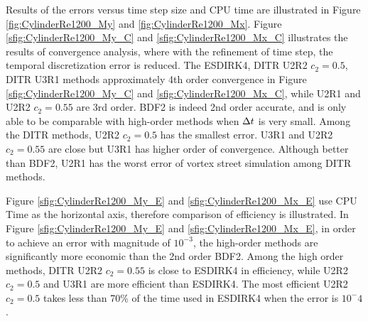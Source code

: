 \documentclass[preprint,12pt]{elsarticle}
\begin{document}
Results of the errors versus time step size and CPU time
are illustrated in
Figure \ref{fig:CylinderRe1200_My} and \ref{fig:CylinderRe1200_Mx}.
Figure \ref{sfig:CylinderRe1200_My_C} and \ref{sfig:CylinderRe1200_Mx_C}
illustrates the results of convergence analysis, where
with the refinement of time step, the temporal
discretization error is reduced.
The ESDIRK4, DITR U2R2 $c_2=0.5$, DITR U3R1 methods
approximately 4th order convergence in
Figure \ref{sfig:CylinderRe1200_My_C} and \ref{sfig:CylinderRe1200_Mx_C},
while U2R1 and U2R2 $c_2=0.55$ are 3rd order.
BDF2 is indeed 2nd order accurate, and is only able
to be comparable with high-order methods when $\mathrm\Delta t$
is very small.
Among the DITR methods, U2R2 $c_2=0.5$ has the smallest error.
U3R1 and U2R2 $c_2=0.55$ are close but U3R1 has higher order of convergence.
Although better than BDF2,
U2R1 has the worst error of vortex street simulation among DITR methods.

Figure \ref{sfig:CylinderRe1200_My_E} and \ref{sfig:CylinderRe1200_Mx_E}
use CPU Time as the horizontal axis, therefore comparison of efficiency is illustrated.
In Figure \ref{sfig:CylinderRe1200_My_E} and \ref{sfig:CylinderRe1200_Mx_E},
in order to achieve an error with magnitude of $10^{-3}$, the
high-order methods are significantly more economic than the
2nd order BDF2.
Among the high order methods, DITR U2R2 $c_2=0.55$ is
close to ESDIRK4 in efficiency, while
U2R2 $c_2=0.5$ and U3R1 are more efficient than ESDIRK4.
The most efficient U2R2 $c_2=0.5$ takes less than 70\% of
the time used in ESDIRK4 when the error is $10^-4$.



\end{document}
